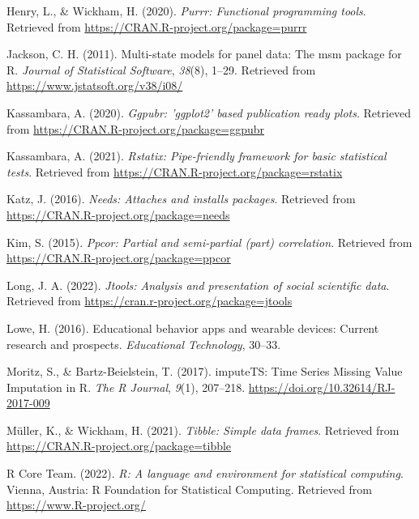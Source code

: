 \documentclass[
  man]{apa6}
\newlength{\cslhangindent}
\newlength{\cslentryspacingunit} %
\newenvironment{CSLReferences}[2] %
 {%
  \setlength{\parindent}{0pt}
  \ifodd #1
  \let\oldpar\par
  \def\par{\hangindent=\cslhangindent\oldpar}
  \fi
  \setlength{\parskip}{#2\cslentryspacingunit}
 }%
 {}
\begin{document}
\begin{CSLReferences}{1}{0}
\leavevmode{}%
Henry, L., \& Wickham, H. (2020). \emph{Purrr: Functional programming tools}. Retrieved from \url{https://CRAN.R-project.org/package=purrr}

\leavevmode{}%
Jackson, C. H. (2011). Multi-state models for panel data: The {msm} package for {R}. \emph{Journal of Statistical Software}, \emph{38}(8), 1--29. Retrieved from \url{https://www.jstatsoft.org/v38/i08/}

\leavevmode{}%
Kassambara, A. (2020). \emph{Ggpubr: 'ggplot2' based publication ready plots}. Retrieved from \url{https://CRAN.R-project.org/package=ggpubr}

\leavevmode{}%
Kassambara, A. (2021). \emph{Rstatix: Pipe-friendly framework for basic statistical tests}. Retrieved from \url{https://CRAN.R-project.org/package=rstatix}

\leavevmode{}%
Katz, J. (2016). \emph{Needs: Attaches and installs packages}. Retrieved from \url{https://CRAN.R-project.org/package=needs}

\leavevmode{}%
Kim, S. (2015). \emph{Ppcor: Partial and semi-partial (part) correlation}. Retrieved from \url{https://CRAN.R-project.org/package=ppcor}

\leavevmode{}%
Long, J. A. (2022). \emph{Jtools: Analysis and presentation of social scientific data}. Retrieved from \url{https://cran.r-project.org/package=jtools}

\leavevmode{}%
Lowe, H. (2016). Educational behavior apps and wearable devices: Current research and prospects. \emph{Educational Technology}, 30--33.

\leavevmode{}%
Moritz, S., \& Bartz-Beielstein, T. (2017). {imputeTS: Time Series Missing Value Imputation in R}. \emph{{The R Journal}}, \emph{9}(1), 207--218. \url{https://doi.org/10.32614/RJ-2017-009}

\leavevmode{}%
Müller, K., \& Wickham, H. (2021). \emph{Tibble: Simple data frames}. Retrieved from \url{https://CRAN.R-project.org/package=tibble}

\leavevmode{}%
R Core Team. (2022). \emph{R: A language and environment for statistical computing}. Vienna, Austria: R Foundation for Statistical Computing. Retrieved from \url{https://www.R-project.org/}


\end{CSLReferences}
\end{document}
